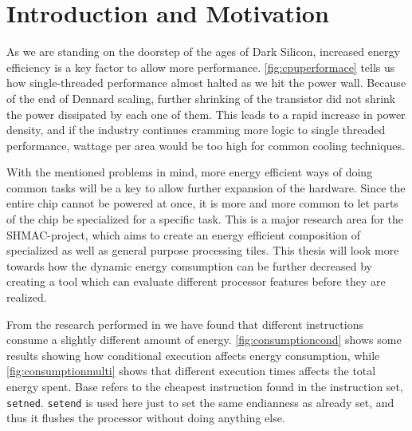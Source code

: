 \section{Introduction and Motivation}







As we are standing on the doorstep of the ages of Dark Silicon, increased energy
efficiency is a key factor to allow more performance.
\autoref{fig:cpuperformace} tells us how single-threaded performance almost
halted as we hit the power wall. Because of the end of Dennard scaling, further
shrinking of the transistor did not shrink the power dissipated by each one of
them. This leads to a rapid increase in power density, and if the industry
continues cramming more logic to single threaded performance, wattage per area
would be too high for common cooling techniques.

With the mentioned problems in mind, more energy efficient ways of doing common
tasks will be a key to allow further expansion of the hardware.  Since the
entire chip cannot be powered at once, it is more and more common to let parts
of the chip be specialized for a specific task. This is a major research area
for the SHMAC-project, which aims to create an energy efficient composition of
specialized as well as general purpose processing tiles. This thesis will
look more towards how the dynamic energy consumption can be further decreased
by creating a tool which can evaluate different processor features before they
are realized.

From the research performed in \cite{rundehvatum2013exploring} we have found
that different instructions consume a slightly different amount of energy.
\autoref{fig:consumptioncond} shows some results showing how conditional
execution affects energy consumption, while \autoref{fig:consumptionmulti}
shows that different execution times affects the total energy spent. Base
refers to the cheapest instruction found in the instruction set, \texttt{setned}.
\texttt{setend} is used here just to set the same endianness as already set,
and thus it flushes the processor without doing anything else.


